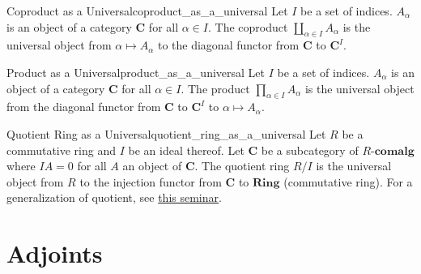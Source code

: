 \documentclass{article}
\begin{document}
\begin{example}{Coproduct as a Universal}{coproduct_as_a_universal}
    Let $I$ be a set of indices.
    $A_\alpha$ is an object of a category $\mathbf{C}$ for all $\alpha \in I$.
    The coproduct $\displaystyle \coprod_{\alpha\in I} A_\alpha$ is the universal object from $\alpha \mapsto A_\alpha$ to the diagonal functor from $\mathbf{C}$ to $\mathbf{C}^I$.
\end{example}

\begin{example}{Product as a Universal}{product_as_a_universal}
    Let $I$ be a set of indices.
    $A_\alpha$ is an object of a category $\mathbf{C}$ for all $\alpha \in I$.
    The product $\displaystyle \prod_{\alpha\in I} A_\alpha$ is the universal object from the diagonal functor from $\mathbf{C}$ to $\mathbf{C}^I$ to $\alpha \mapsto A_\alpha$.
\end{example}

\begin{example}{Quotient Ring as a Universal}{quotient_ring_as_a_universal}
    Let $R$ be a commutative ring and $I$ be an ideal thereof.
    Let $\mathbf{C}$ be a subcategory of $R$-$\mathbf{comalg}$ where $IA = 0$ for all $A$ an object of $\mathbf{C}$.
    The quotient ring $R/I$ is the universal object from $R$ to the injection functor from $\mathbf{C}$ to $\mathbf{Ring}$ (commutative ring).
    For a generalization of quotient, see \href{https://uwseminars.com/archive/ly-UPQ/}{this seminar}.
\end{example}

\section{Adjoints}
\end{document}
